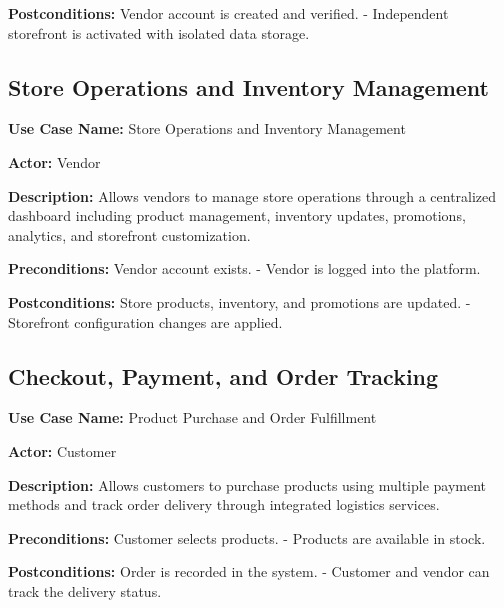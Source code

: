 \textbf{Postconditions:} Vendor account is created and verified. - Independent
storefront is activated with isolated data storage.

\subsection{Store Operations and Inventory Management}

\textbf{Use Case Name:} Store Operations and Inventory Management

\textbf{Actor:} Vendor

\textbf{Description:} Allows vendors to manage store operations through a
centralized dashboard including product management, inventory updates,
promotions, analytics, and storefront customization.

\textbf{Preconditions:} Vendor account exists. - Vendor is logged into the
platform.

\textbf{Postconditions:} Store products, inventory, and promotions are
updated. - Storefront configuration changes are applied.

\subsection{Checkout, Payment, and Order Tracking}

\textbf{Use Case Name:} Product Purchase and Order Fulfillment

\textbf{Actor:} Customer

\textbf{Description:} Allows customers to purchase products using multiple payment
methods and track order delivery through integrated logistics services.

\textbf{Preconditions:} Customer selects products. - Products are available in
stock.

\textbf{Postconditions:} Order is recorded in the system. - Customer and vendor
can track the delivery status.
